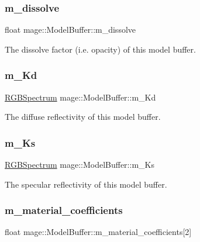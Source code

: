 \subsubsection{\texorpdfstring{m\+\_\+dissolve}{m\_dissolve}}
{\footnotesize\ttfamily float mage\+::\+Model\+Buffer\+::m\+\_\+dissolve}

The dissolve factor (i.\+e. opacity) of this model buffer. \hypertarget{structmage_1_1_model_buffer_a3a0212d49721bc44c28f9ba1fbe38e1e}{}\label{structmage_1_1_model_buffer_a3a0212d49721bc44c28f9ba1fbe38e1e} 
\subsubsection{\texorpdfstring{m\+\_\+\+Kd}{m\_Kd}}
{\footnotesize\ttfamily \hyperlink{structmage_1_1_r_g_b_spectrum}{R\+G\+B\+Spectrum} mage\+::\+Model\+Buffer\+::m\+\_\+\+Kd}

The diffuse reflectivity of this model buffer. \hypertarget{structmage_1_1_model_buffer_a0f1c0dc40a4252b4a79bd2d9c30b3fca}{}\label{structmage_1_1_model_buffer_a0f1c0dc40a4252b4a79bd2d9c30b3fca} 
\subsubsection{\texorpdfstring{m\+\_\+\+Ks}{m\_Ks}}
{\footnotesize\ttfamily \hyperlink{structmage_1_1_r_g_b_spectrum}{R\+G\+B\+Spectrum} mage\+::\+Model\+Buffer\+::m\+\_\+\+Ks}

The specular reflectivity of this model buffer. \hypertarget{structmage_1_1_model_buffer_a2e3348c4bfd065cd692f2086c62297bf}{}\label{structmage_1_1_model_buffer_a2e3348c4bfd065cd692f2086c62297bf} 
\subsubsection{\texorpdfstring{m\+\_\+material\+\_\+coefficients}{m\_material\_coefficients}}
{\footnotesize\ttfamily float mage\+::\+Model\+Buffer\+::m\+\_\+material\+\_\+coefficients\mbox{[}2\mbox{]}}

